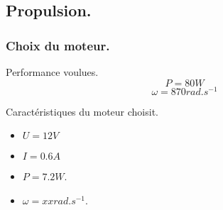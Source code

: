 \subsection{Propulsion.}
\begin{frame}
    \frametitle{Choix du moteur.}
    \begin{exampleblock}{Performance voulues.}
        \[ P = 80W \]
        \[ \omega = 870rad.s^{-1} \]
    \end{exampleblock}
     {
        \begin{block}{Caractéristiques du moteur choisit.}
            \begin{itemize} %
                \item $U = 12V$
                \item $I = 0.6A$
                \item $P = 7.2W$.
                \item $\omega = xxrad.s^{-1}$.
            \end{itemize}
        \end{block}
    }
\end{frame}

